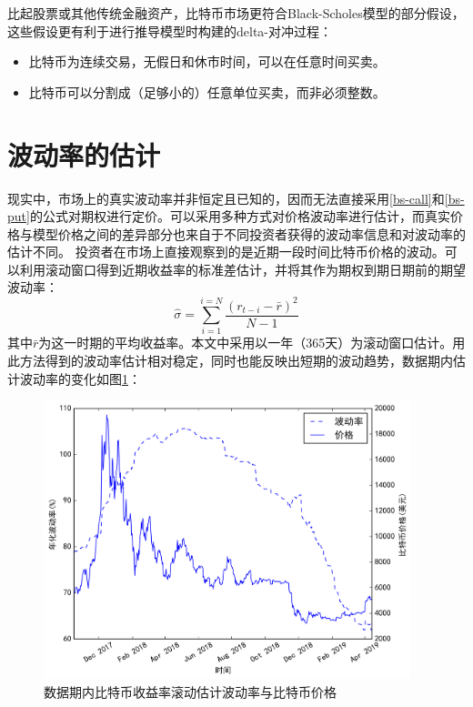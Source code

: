    比起股票或其他传统金融资产，比特币市场更符合Black-Scholes模型的部分假设，这些假设更有利于进行推导模型时构建的delta-对冲过程：
        \begin{itemize}
            \item 比特币为连续交易，无假日和休市时间，可以在任意时间买卖。
            \item 比特币可以分割成（足够小的）任意单位买卖，而非必须整数。
        \end{itemize}
    
    \section{波动率的估计}\label{volatility-estimation}
    现实中，市场上的真实波动率并非恒定且已知的，因而无法直接采用\ref{bs-call}和\ref{bs-put}的公式对期权进行定价。可以采用多种方式对价格波动率进行估计，而真实价格与模型价格之间的差异部分也来自于不同投资者获得的波动率信息和对波动率的估计不同。
    投资者在市场上直接观察到的是近期一段时间比特币价格的波动。可以利用滚动窗口得到近期收益率的标准差估计，并将其作为期权到期日期前的期望波动率：
    \begin{equation}\label{volatility-rolling}
        \hat{\sigma}=\sum_{i=1}^{i=N}\frac{(r_{t-i}-\bar{r})^2}{N-1}
    \end{equation}
    其中$\bar{r}$为这一时期的平均收益率。本文中采用以一年（365天）为滚动窗口估计。用此方法得到的波动率估计相对稳定，同时也能反映出短期的波动趋势，数据期内估计波动率的变化如图\ref{fig:volatility}：
    \begin{figure}[H]
        \begin{small} 
            \begin{center}
                \includegraphics[width=0.95\textwidth]{figures/volatility.png}
            \end{center}
            \caption{数据期内比特币收益率滚动估计波动率与比特币价格}
            \label{fig:volatility}
        \end{small}
    \end{figure}
